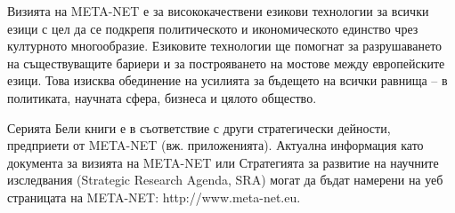 \documentclass[]{../../metanetpaper}
\begin{document}
\begin{multicols}{2}
Визията на META-NET е за висококачествени езикови технологии за всички езици с цел да се подкрепя политическото и икономическото единство чрез културното многообразие. Езиковите технологии ще помогнат за разрушаването на съществуващите бариери и за построяването на мостове между европейските езици. Това изисква обединение на усилията за бъдещето на всички равнища – в политиката, научната сфера, бизнеса и цялото общество.

Серията Бели книги е в съответствие с други стратегически дейности, предприети от META-NET (вж. приложенията). Актуална информация като документа за визията на META-NET \cite{Meta1} или Стратегията за развитие на научните изследвания (Strategic Research Agenda, SRA) могат да бъдат намерени на уеб страницата на META-NET: http://www.meta-net.eu.
\end{multicols}

\clearpage

\end{document}
